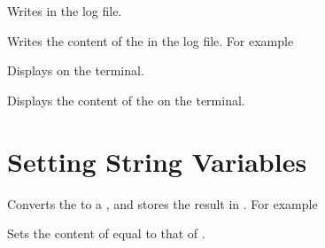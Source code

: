 \documentclass[oneside]{book}
\begin{document}
\begin{function}{\StrLog}
\begin{syntax}
 
\end{syntax}
Writes  in the log file.
\end{function}

\begin{function}{\StrVarLog}
\begin{syntax}
 
\end{syntax}
Writes the content of the  in the log file.
For example
\begin{codehigh}
\StrSet {}
\StrVarLog \lTmpiStr
\end{codehigh}
\end{function}

\begin{function}{\StrShow}
\begin{syntax}
 
\end{syntax}
Displays  on the terminal.
\end{function}

\begin{function}{\StrVarShow}
\begin{syntax}
 
\end{syntax}
Displays the content of the  on the terminal.
\end{function}

\section{Setting String Variables}

\begin{function}{\StrSet}
\begin{syntax}
  
\end{syntax}
Converts the  to a , and stores the
result in . For example
\begin{demohigh}
\StrSet {}
\StrUse \lTmpiStr
\end{demohigh}
\end{function}

\begin{function}{\StrSetEq}
\begin{syntax}
  
\end{syntax}
Sets the content of  equal to that of
.
\end{function}
\end{document}

